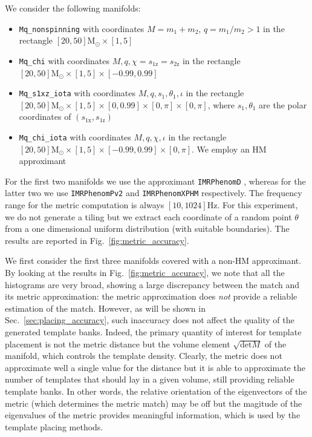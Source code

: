\documentclass[twocolumn,showpacs,preprintnumbers,nofootinbib,prd,
superscriptaddress,10pt]{revtex4-2}
\begin{document}
We consider the following manifolds:
\begin{itemize}
	\item \texttt{Mq\_nonspinning} with coordinates ${M = m_1+m_2}$, ${q = m_1/m_2>1}$ in the rectangle $[20, 50] \mathrm{M_\odot} \times [1,5]$
	\item \texttt{Mq\_chi} with coordinates $M, q, \chi = s_\text{1z} = s_\text{2z}$ in the rectangle $[20, 50] \mathrm{M_\odot} \times [1,5] \times [-0.99, 0.99]$
	\item \texttt{Mq\_s1xz\_iota} with coordinates $M, q, s_\text{1}, \theta_1, \iota$ in the rectangle $[20, 50] \mathrm{M_\odot} \times [1,5] \times [0, 0.99] \times [0,\pi]  \times [0,\pi]$, where $s_1, \theta_1$ are the polar coordinates of $(s_\text{1x}, s_\text{1z})$
	\item \texttt{Mq\_chi\_iota} with coordinates $M, q, \chi, \iota$ in the rectangle $[20, 50] \mathrm{M_\odot} \times [1,5] \times [-0.99, 0.99] \times [0,\pi]$. We employ an HM approximant
\end{itemize}

For the first two manifolds we use the approximant \texttt{IMRPhenomD} \cite{PhysRevD.93.044006, PhysRevD.93.044007}, whereas for the latter two we use \texttt{IMRPhenomPv2} \cite{PhysRevLett.113.151101} and \texttt{IMRPhenomXPHM} \cite{PhysRevD.103.104056} respectively.
The frequency range for the metric computation is always $[10, 1024]\text{Hz}$.
For this experiment, we do not generate a tiling but we extract each coordinate of a random point $\theta$ from a one dimensional uniform distribution (with suitable boundaries).
The results are reported in Fig.~\ref{fig:metric_accuracy}.

We first consider the first three manifolds covered with a non-HM approximant.
By looking at the results in Fig.~\ref{fig:metric_accuracy}, we note that all the histograms are very broad, showing a large discrepancy between the match and its metric approximation: the metric approximation does {\it not} provide a reliable estimation of the match. 
However, as will be shown in Sec.~\ref{sec:placing_accuracy}, such inaccuracy does not affect the quality of the generated template banks. Indeed, the primary quantity of interest for template placement is not the metric distance but the volume element $\sqrt{\text{det}M}$ of the manifold, which controls the template density. Clearly, the metric does not approximate well a single value for the distance but it is able to approximate the number of templates that should lay in a given volume, still providing reliable template banks.
In other words, the relative orientation of the eigenvectors of the metric (which determines the metric match) may be off but the magitude of the eigenvalues of the metric provides meaningful information, which is used by the template placing methods.
\end{document}
